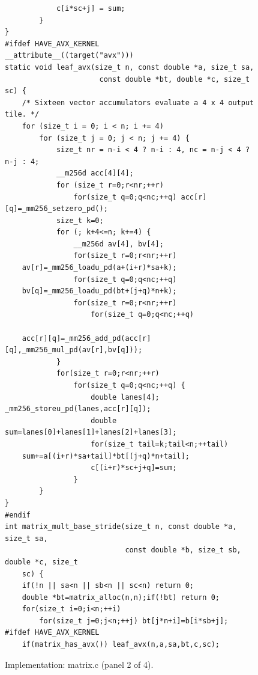 \documentclass[11pt,a4paper]{article}
\begin{document}
\begin{figure}[!htbp]\begin{minipage}{\linewidth}\fontsize{10}{11.4}\selectfont\begin{verbatim}
            c[i*sc+j] = sum;
        }
}
#ifdef HAVE_AVX_KERNEL
__attribute__((target("avx")))
static void leaf_avx(size_t n, const double *a, size_t sa,
                      const double *bt, double *c, size_t sc) {
    /* Sixteen vector accumulators evaluate a 4 x 4 output tile. */
    for (size_t i = 0; i < n; i += 4)
        for (size_t j = 0; j < n; j += 4) {
            size_t nr = n-i < 4 ? n-i : 4, nc = n-j < 4 ? n-j : 4;
            __m256d acc[4][4];
            for (size_t r=0;r<nr;++r)
                for(size_t q=0;q<nc;++q) acc[r][q]=_mm256_setzero_pd();
            size_t k=0;
            for (; k+4<=n; k+=4) {
                __m256d av[4], bv[4];
                for(size_t r=0;r<nr;++r) 
    av[r]=_mm256_loadu_pd(a+(i+r)*sa+k);
                for(size_t q=0;q<nc;++q) 
    bv[q]=_mm256_loadu_pd(bt+(j+q)*n+k);
                for(size_t r=0;r<nr;++r)
                    for(size_t q=0;q<nc;++q)
                        
    acc[r][q]=_mm256_add_pd(acc[r][q],_mm256_mul_pd(av[r],bv[q]));
            }
            for(size_t r=0;r<nr;++r)
                for(size_t q=0;q<nc;++q) {
                    double lanes[4]; _mm256_storeu_pd(lanes,acc[r][q]);
                    double sum=lanes[0]+lanes[1]+lanes[2]+lanes[3];
                    for(size_t tail=k;tail<n;++tail) 
    sum+=a[(i+r)*sa+tail]*bt[(j+q)*n+tail];
                    c[(i+r)*sc+j+q]=sum;
                }
        }
}
#endif
int matrix_mult_base_stride(size_t n, const double *a, size_t sa,
                            const double *b, size_t sb, double *c, size_t 
    sc) {
    if(!n || sa<n || sb<n || sc<n) return 0;
    double *bt=matrix_alloc(n,n);if(!bt) return 0;
    for(size_t i=0;i<n;++i)
        for(size_t j=0;j<n;++j) bt[j*n+i]=b[i*sb+j];
#ifdef HAVE_AVX_KERNEL
    if(matrix_has_avx()) leaf_avx(n,a,sa,bt,c,sc);
\end{verbatim}\end{minipage}\caption{Implementation: matrix.c (panel 2 of 4).}\end{figure}
\end{document}
